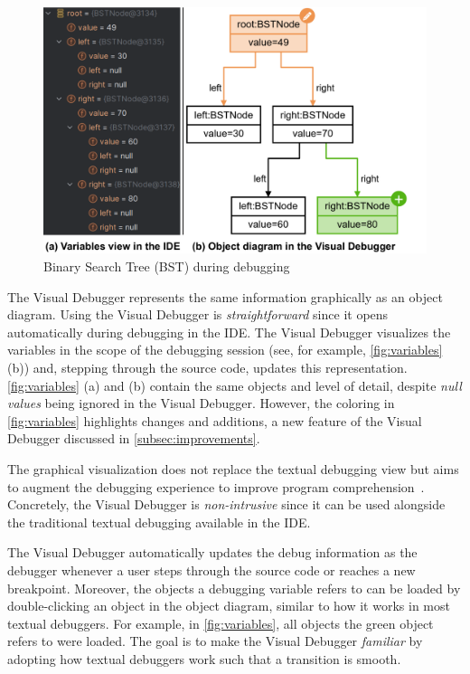 \documentclass[sigconf]{acmart}
\begin{document}
\begin{figure}[ht]
    \centering
    \includegraphics[width=1\linewidth]{images/visual-debugger-variables.pdf}
    \caption{Binary Search Tree (BST) during debugging}
    \label{fig:variables}
\end{figure}

The Visual Debugger represents the same information graphically as an object diagram.
Using the Visual Debugger is \textit{straightforward} since it opens automatically during debugging in the IDE.
The Visual Debugger visualizes the variables in the scope of the debugging session (see, for example, \autoref{fig:variables} (b)) and, stepping through the source code, updates this representation.
\autoref{fig:variables} (a) and (b) contain the same objects and level of detail, despite \textit{null values} being ignored in the Visual Debugger.
However, the coloring in \autoref{fig:variables} highlights changes and additions, a new feature of the Visual Debugger discussed in \autoref{subsec:improvements}.

The graphical visualization does not replace the textual debugging view but aims to augment the debugging experience to improve program comprehension~\cite{krauterVisualDebuggerTool2022}.
Concretely, the Visual Debugger is \textit{non-intrusive} since it can be used alongside the traditional textual debugging available in the IDE.

The Visual Debugger automatically updates the debug information as the \intellij{} debugger whenever a user steps through the source code or reaches a new breakpoint.
Moreover, the objects a debugging variable refers to can be loaded by double-clicking an object in the object diagram, similar to how it works in most textual debuggers.
For example, in \autoref{fig:variables}, all objects the green object refers to were loaded.
The goal is to make the Visual Debugger \textit{familiar} by adopting how textual debuggers work such that a transition is smooth.
\end{document}
